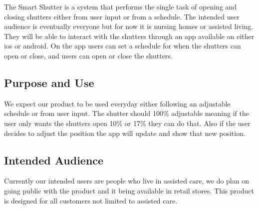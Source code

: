 The Smart Shutter is a system that performs the single task of opening and closing shutters either from user input or from a schedule. The intended user audience is eventually everyone but for now it is nursing homes or assisted living. They will be able to interact with the shutters through an app available on either ios or android. On the app users can set a schedule for when the shutters can open or close, and users can open or close the shutters.  

\subsection{Purpose and Use}
We expect our product to be used everyday either following an adjustable schedule or from user input. The shutter should 100\% adjustable meaning if the user only wants the shutters open 10\% or 17\% they can do that. Also if the user decides to adjust the position the app will update and show that new position.

\subsection{Intended Audience}
Currently our intended users are people who live in assisted care, we do plan on going public with the product and it being available in retail stores. This product is designed for all customers not limited to assisted care.

